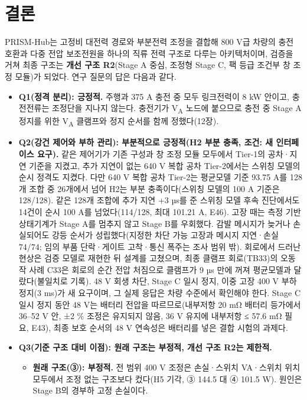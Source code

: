 \chapter{결론}

PRISM-Hub는 고정비 대전력 경로와 부분전력 조정을 결합해 800 V급 차량의 충전 호환과 다중 전압 보조전원을 하나의 직류 전력 구조로 다루는 아키텍처이며, 검증을 거쳐 최종 구조는 \textbf{개선 구조 R2}(Stage A 중심, 조정형 Stage C, 팩 등급 조건부 창 조정 모듈)가 되었다. 연구 질문의 답은 다음과 같다.

\begin{itemize}
\item \textbf{Q1(정격 분리): 긍정적.} 주행과 375 A 충전 중 모두 링크전력이 8 kW 안이고, 충전전류는 조정단을 지나지 않는다. 충전기가 V\textsubscript{A} 노드에 붙으므로 충전 중 Stage A 정지를 위한 V\textsubscript{A} 클램프와 정지 순서를 함께 정했다(12장).
\item \textbf{Q2(강건 제어와 부하 관리): 부분적으로 긍정적(H2 부분 충족, 조건: 새 인터페이스 요구).} 같은 제어기가 기존 구성과 창 조정 모듈 모두에서 Tier-1의 공차·지연 기준을 지켰고, 추가 지연이 없는 640 V 복합 공차 Tier-2에서는 스위칭 모델의 순시 정격도 지켰다. 다만 640 V 복합 공차 Tier-2는 평균모델 기준 93.75 A를 128개 조합 중 26개에서 넘어 H2는 부분 충족이다(스위칭 모델의 100 A 기준은 128/128). 같은 128개 조합에 추가 지연 +3 µs를 준 스위칭 모델 후속 진단에서도 14건이 순시 100 A를 넘었다(114/128, 최대 101.21 A, E46). 고장 때는 측정 기반 상태기계가 Stage A를 멈추지 않고 Stage B를 우회했다. 감발 메시지가 늦거나 손실되어도 강등 순서가 성립했다(지정한 차단 가능 고장과 메시지 지연·손실 74/74; 임의 부품 단락·게이트 고착·통신 폭주는 조사 범위 밖). 회로에서 드러난 현상은 검증 모델로 재현한 뒤 설계를 고쳤으며, 최종 클램프 회로(TB33)의 오동작 사례 C33은 회로의 순간 전압 처짐으로 클램프가 9 µs 만에 꺼져 평균모델과 달랐다(불일치로 기록). 48 V 회생 차단, Stage C 일시 정지, 이중 고장 400 V 부하 정지(3 ms)가 새 요구이며, 그 실제 응답은 차량 수준에서 확인해야 한다. Stage C 일시 정지 동안 48 V는 배터리 전압을 따르므로(내부저항 20 mΩ 배터리 등가에서 36–52 V 안, ±2 \% 조정은 유지되지 않음, 36 V 유지에 내부저항 ≤ 57.6 mΩ 필요, E43), 최종 보호 순서의 48 V 연속성은 배터리를 넣은 결합 시험의 과제다.
\item \textbf{Q3(기준 구조 대비 이점): 원래 구조는 부정적, 개선 구조 R2는 제한적.}
\begin{itemize}
\item \textbf{원래 구조(③): 부정적.} 전 범위 400 V 조정은 손실·스위치 VA·스위치 위치 모두에서 조정 없는 구조보다 컸다(H5 기각, ③ 144.5 대 ④ 101.5 W). 원인은 Stage B의 경부하 고정 손실이다.

\end{itemize}
\end{itemize}
